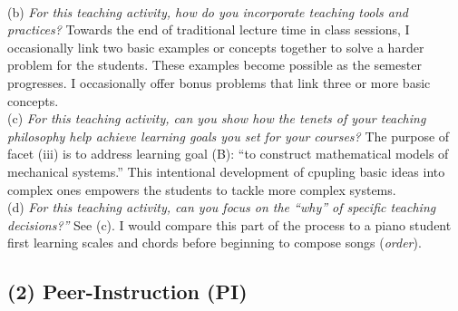 \documentclass[../../../main.tex]{subfiles}
\begin{document}
\\
\vspace{0.25cm}
(b) \textit{For this teaching activity, how do you incorporate teaching tools and practices?} Towards the end of traditional lecture time in class sessions, I occasionally link two basic examples or concepts together to solve a harder problem for the students.  These examples become possible as the semester progresses.  I occasionally offer bonus problems that link three or more basic concepts.
\\
\vspace{0.25cm}
(c) \textit{For this teaching activity, can you show how the tenets of your teaching philosophy help achieve learning goals you set for your courses?}  The purpose of facet (iii) is to address learning goal (B): ``to construct mathematical models of mechanical systems.''  This intentional development of cpupling basic ideas into complex ones empowers the students to tackle more complex systems. 
\\
\vspace{0.25cm}
(d) \textit{For this teaching activity, can you focus on the ``why'' of specific teaching decisions?''}  See (c).  I would compare this part of the process to a piano student first learning scales and chords before beginning to compose songs (\textit{order}).

\subsection{(2) Peer-Instruction (PI)}
\end{document}
